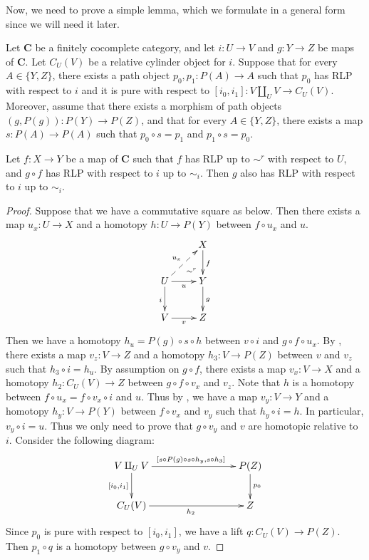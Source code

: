 \documentclass{amsart}
\theoremstyle{definition}
\newcommand{\cat}[1]{\mathbf{#1}}
\newcommand{\C}{\cat{C}}
\newcommand{\cyli}{i}
\begin{document}
Now, we need to prove a simple lemma, which we formulate in a general form since we will need it later.

\begin{lem}[we-bot]
Let $\C$ be a finitely cocomplete category, and let $i : U \to V$ and $g : Y \to Z$ be maps of $\C$.
Let $C_U(V)$ be a relative cylinder object for $i$.
Suppose that for every $A \in \{ Y, Z \}$, there exists a path object $p_0,p_1 : P(A) \to A$ such that
$p_0$ has RLP with respect to $i$ and it is pure with respect to $[\cyli_0,\cyli_1] : V \amalg_U V \to C_U(V)$.
Moreover, assume that there exists a morphism of path objects $(g,P(g)) : P(Y) \to P(Z)$,
and that for every $A \in \{ Y, Z \}$, there exists a map $s : P(A) \to P(A)$ such that $p_0 \circ s = p_1$ and $p_1 \circ s = p_0$.

Let $f : X \to Y$ be a map of $\C$ such that $f$ has RLP up to $\sim^r$ with respect to $U$, and $g \circ f$ has RLP with respect to $i$ up to $\sim_i$.
Then $g$ also has RLP with respect to $i$ up to $\sim_i$.
\end{lem}
\begin{proof}
Suppose that we have a commutative square as below.
Then there exists a map $u_x : U \to X$ and a homotopy $h : U \to P(Y)$ between $f \circ u_x$ and $u$.
\[ \xymatrix{   \ar@{}[dr]|(.7){\sim^r}               & X \ar[d]^f \\
              U \ar@{-->}[ur]^{u_x} \ar[d]_i \ar[r]_u & Y \ar[d]^g \\
              V \ar[r]_v                              & Z
            } \]
Then we have a homotopy $h_u = P(g) \circ s \circ h$ between $v \circ i$ and $g \circ f \circ u_x$.
By , there exists a map $v_z : V \to Z$ and a homotopy $h_3 : V \to P(Z)$ between $v$ and $v_z$ such that $h_3 \circ i = h_u$.
By assumption on $g \circ f$, there exists a map $v_x : V \to X$ and a homotopy $h_2 : C_U(V) \to Z$ between $g \circ f \circ v_x$ and $v_z$.
Note that $h$ is a homotopy between $f \circ u_x = f \circ v_x \circ i$ and $u$.
Thus by , we have a map $v_y : V \to Y$ and a homotopy $h_y : V \to P(Y)$ between $f \circ v_x$ and $v_y$ such that $h_y \circ i = h$.
In particular, $v_y \circ i = u$.
Thus we only need to prove that $g \circ v_y$ and $v$ are homotopic relative to $i$.
Consider the following diagram:
\[ \xymatrix{ V \amalg_U V \ar[rrr]^{[s \circ P(g) \circ s \circ h_y, s \circ h_3]} \ar[d]_{[\cyli_0,\cyli_1]} & & & P(Z) \ar[d]^{p_0} \\
              C_U(V) \ar[rrr]_{h_2} & & & Z
            } \]
Since $p_0$ is pure with respect to $[\cyli_0,\cyli_1]$, we have a lift $q : C_U(V) \to P(Z)$.
Then $p_1 \circ q$ is a homotopy between $g \circ v_y$ and $v$.
\end{proof}
\end{document}

